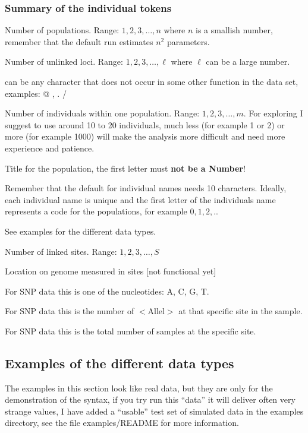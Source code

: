 \subsubsection{Summary of the individual tokens}
\begin{entry}{5cm}
\item[\token{Number of populations}] Number of populations. Range: $1, 2, 3, \dots, n$ where $n$ is a smallish number, remember that the default \migrate run estimates $n^2$ parameters.
\item[\token{Number of Loci}] Number of unlinked loci. Range: $1, 2, 3, \dots, \ell$ where $\ell$ can be a large number.
\item[\token{Delimiter}] can be any character that does not occur in some other function in the data set, examples: @ , . /
\item[\token{Number of individuals}] Number of individuals within one population.  Range: $1, 2, 3, \dots, m$. For exploring \migrate I suggest to use around 10 to 20 individuals, much less (for example 1 or 2) or more (for example 1000) will make the analysis more difficult and need more experience and patience. 
\item[\token{Title for population}] Title for the population, the first letter must \textbf{not be a Number}!
\item[\token{Individual}]  Remember that the default for individual names needs 10 characters. Ideally, each individual name is unique and the first letter of the individuals name represents a code for the populations, for example $0,1,2,..$  
\item[\token{Data}] See examples for the different data types.
\item[\token{Number of sites}] Number of linked sites.  Range: $1, 2, 3, \dots, S$ 
\item[\token{Position on Chromosome}] Location on genome measured in sites [not functional yet]
\item[\token{Allele}] For SNP data this is one of the nucleotides: A, C, G, T.
\item[\token{Number}] For SNP data this is the number of $<$Allel$>$ at that specific site in the sample. 
\item[\token{Total}] For SNP data this is the total number of  samples at the specific site. 
\end{entry}

\subsection{Examples of the different data types}
The examples in this section look like real data, but they are only
for the demonstration of the syntax, if you try run this ``data''
it will deliver often very strange values, I have added a ``usable'' test set
of simulated data in the examples directory, see the file examples/README 
for more information.
